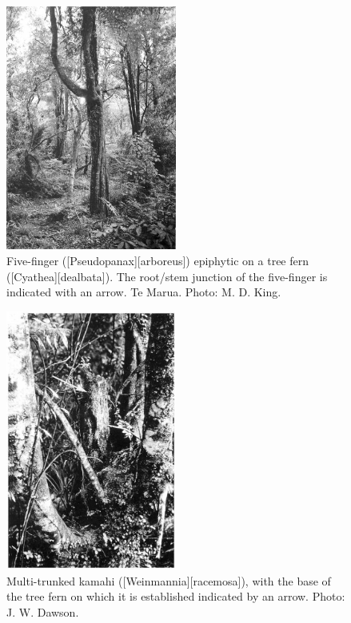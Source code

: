 \begin{figure}
	\includegraphics[width=0.5\textwidth]{graphics/figure55fivefinger.jpg}
	\centering
	\caption[Five-finger epiphytic on a tree fern]{Five-finger ([Pseudopanax][arboreus]) epiphytic on a tree fern ([Cyathea][dealbata]). The root/stem junction of the five-finger is indicated with an arrow. Te Marua. Photo:  M. D. King.}%
	\label{fig:55fivefinger}
\end{figure}

\begin{figure}
	\includegraphics[width=0.5\textwidth]{graphics/figure56kamahi.jpg}
	\centering
	\caption[Multi-trunked kamahi]{Multi-trunked kamahi ([Weinmannia][racemosa]), with the base of the tree fern on which it is established indicated by an arrow.
	Photo: J. W. Dawson.}%
	\label{fig:56kamahi}
\end{figure}

